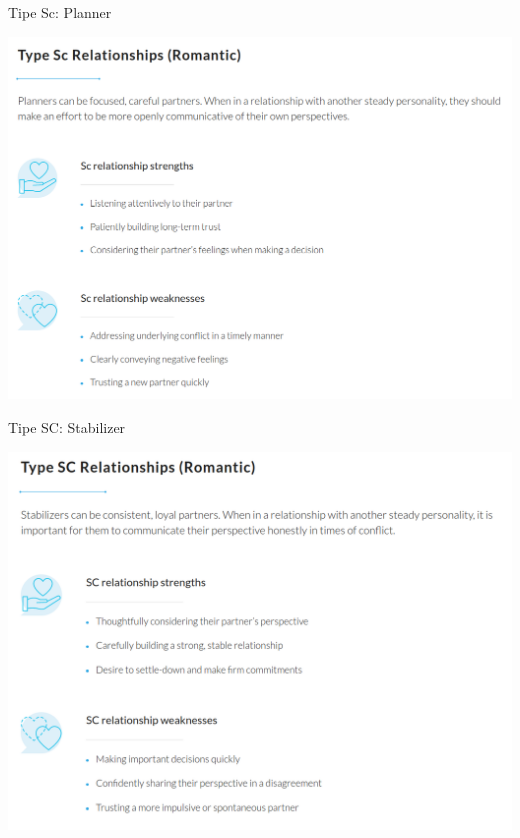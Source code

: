 \documentclass{beamer}
\theoremstyle{mystyle}
\begin{document}
\begin{frame}{Tipe Sc: Planner}
	\begin{center}
		\includegraphics[scale=.275]{images/Sc}
	\end{center}
\end{frame}


\begin{frame}{Tipe SC: Stabilizer}
	\begin{center}
		\includegraphics[scale=.275]{images/SC}
	\end{center}
\end{frame}
\end{document}
